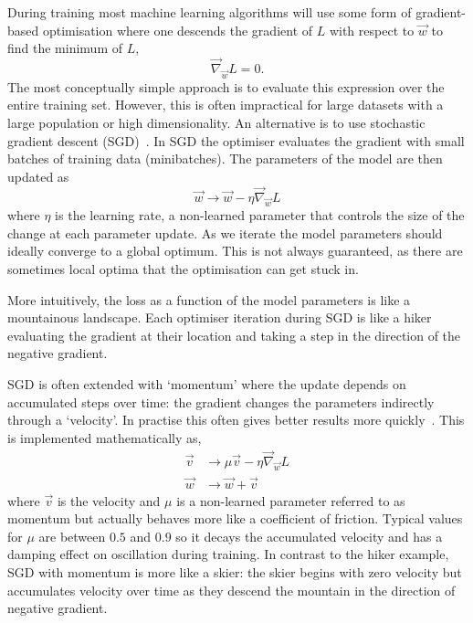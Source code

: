 During training most machine learning algorithms will use some form of gradient-based optimisation where one descends the gradient of $L$ with respect to $\vec{w}$ to find the minimum of $L$,
\begin{equation}
    \vec{\nabla}_{\vec{w}}L = 0.
\end{equation}
The most conceptually simple approach is to evaluate this expression over the entire training set. However, this is often impractical for large datasets with a large population or high dimensionality. 
An alternative is to use stochastic gradient descent (SGD)~\cite{DeepLearningBook}. In SGD the optimiser evaluates the gradient with small batches of training data (minibatches). 
The parameters of the model are then updated as
\begin{equation}
    \vec{w} \rightarrow \vec{w} - \eta\vec{\nabla}_{\vec{w}}L
\end{equation}
where $\eta$ is the learning rate, a non-learned parameter that controls the size of the change at each parameter update. 
As we iterate the model parameters should ideally converge to a global optimum. 
This is not always guaranteed, as there are sometimes local optima that the optimisation can get stuck in. 

More intuitively, the loss as a function of the model parameters is like a mountainous landscape. 
Each optimiser iteration during SGD is like a hiker evaluating the gradient at their location and taking a step in the direction of the negative gradient.

SGD is often extended with `momentum' where the update depends on accumulated steps over time: the gradient changes the parameters indirectly through a `velocity'. 
In practise this often gives better results more quickly~\cite{CS231n}.
This is implemented mathematically as,
\begin{equation}
    \begin{split}
        \vec{v} &\rightarrow \mu\vec{v} - \eta\vec{\nabla}_{\vec{w}}L \\
        \vec{w} &\rightarrow \vec{w} + \vec{v}
    \end{split}
\end{equation}
where $\vec{v}$ is the velocity and $\mu$ is a non-learned parameter referred to as momentum but actually behaves more like a coefficient of friction. 
Typical values for $\mu$ are between $0.5$ and $0.9$ so it decays the accumulated velocity and has a damping effect on oscillation during training. 
In contrast to the hiker example, SGD with momentum is more like a skier: the skier begins with zero velocity but accumulates velocity over time as they descend the mountain in the direction of negative gradient. 

